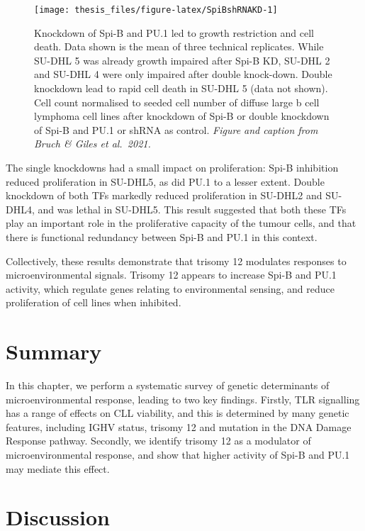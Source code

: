 \documentclass[11pt, a4paper, twosided]{book}
\begin{document}
\begin{figure}

{\centering \texttt{[image: thesis\_files/figure-latex/SpiBshRNAKD-1]} 

}

\caption{Knockdown of Spi-B and PU.1 led to growth restriction and cell death. Data shown is the mean of three technical replicates. While SU-DHL 5 was already growth impaired after Spi-B KD, SU-DHL 2 and SU-DHL 4 were only impaired after double knock-down. Double knockdown lead to rapid cell death in SU-DHL 5 (data not shown). Cell count normalised to seeded cell number of diffuse large b cell lymphoma cell lines after knockdown of Spi-B or double knockdown of Spi-B and PU.1 or shRNA as control. \emph{Figure and caption from Bruch \& Giles et al.~2021.}}\label{fig:SpiBshRNAKD}
\end{figure}
The single knockdowns had a small impact on proliferation: Spi-B inhibition reduced proliferation in SU-DHL5, as did PU.1 to a lesser extent. Double knockdown of both TFs markedly reduced proliferation in SU-DHL2 and SU-DHL4, and was lethal in SU-DHL5. This result suggested that both these TFs play an important role in the proliferative capacity of the tumour cells, and that there is functional redundancy between Spi-B and PU.1 in this context.

Collectively, these results demonstrate that trisomy 12 modulates responses to microenvironmental signals. Trisomy 12 appears to increase Spi-B and PU.1 activity, which regulate genes relating to environmental sensing, and reduce proliferation of cell lines when inhibited.

\hypertarget{summary-1}{%
\section{Summary}\label{summary-1}}

In this chapter, we perform a systematic survey of genetic determinants of microenvironmental response, leading to two key findings. Firstly, TLR signalling has a range of effects on CLL viability, and this is determined by many genetic features, including IGHV status, trisomy 12 and mutation in the DNA Damage Response pathway. Secondly, we identify trisomy 12 as a modulator of microenvironmental response, and show that higher activity of Spi-B and PU.1 may mediate this effect.

\hypertarget{discussion-1}{%
\section{Discussion}\label{discussion-1}}
\end{document}
